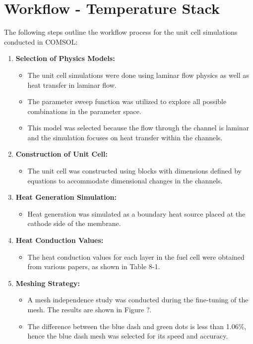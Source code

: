     \section{Workflow - Temperature Stack}
    The following steps outline the workflow process for the unit cell simulations conducted in COMSOL:

    \begin{enumerate}
        \item \textbf{Selection of Physics Models:}
        \begin{itemize}
            \item The unit cell simulations were done using laminar flow physics as well as heat transfer in laminar flow.
            \item The parameter sweep function was utilized to explore all possible combinations in the parameter space.
            \item This model was selected because the flow through the channel is laminar and the simulation focuses on heat transfer within the channels.
        \end{itemize}
        
        \item \textbf{Construction of Unit Cell:}
        \begin{itemize}
            \item The unit cell was constructed using blocks with dimensions defined by equations to accommodate dimensional changes in the channels.
        \end{itemize}
        
        \item \textbf{Heat Generation Simulation:}
        \begin{itemize}
            \item Heat generation was simulated as a boundary heat source placed at the cathode side of the membrane.
        \end{itemize}
        
        \item \textbf{Heat Conduction Values:}
        \begin{itemize}
            \item The heat conduction values for each layer in the fuel cell were obtained from various papers, as shown in Table 8-1.
        \end{itemize}
        
        \item \textbf{Meshing Strategy:}
        \begin{itemize}
            \item A mesh independence study was conducted during the fine-tuning of the mesh. The results are shown in Figure ?.
            \item The difference between the blue dash and green dots is less than 1.06\%, hence the blue dash mesh was selected for its speed and accuracy.
        \end{itemize}
        

\end{enumerate}
